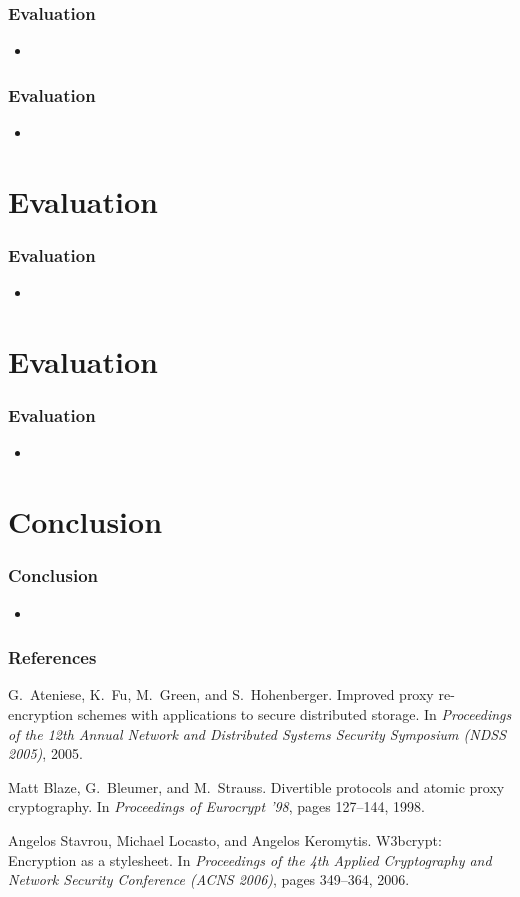 \documentclass{beamer}
\begin{document}
\begin{frame}
\frametitle{Evaluation}
\begin{itemize}
\item
\end{itemize}
\end{frame}

\begin{frame}
\frametitle{Evaluation}
\begin{itemize}
\item
\end{itemize}
\end{frame}

\section{Evaluation}
\begin{frame}
\frametitle{Evaluation}
\begin{itemize}
\item
\end{itemize}
\end{frame}

\section{Evaluation}
\begin{frame}
\frametitle{Evaluation}
\begin{itemize}
\item
\end{itemize}
\end{frame}

\section{Conclusion}
\begin{frame}
\frametitle{Conclusion}
\begin{itemize}
\item
\end{itemize}
\end{frame}

\begin{thebibliography}{10}
\frametitle{References}
G.~Ateniese, K.~Fu, M.~Green, and S.~Hohenberger.
\newblock Improved proxy re-encryption schemes with applications to secure
  distributed storage.
\newblock In {\em Proceedings of the 12th Annual Network and Distributed
  Systems Security Symposium (NDSS 2005)}, 2005.

Matt Blaze, G.~Bleumer, and M.~Strauss.
\newblock Divertible protocols and atomic proxy cryptography.
\newblock In {\em Proceedings of Eurocrypt '98}, pages 127--144, 1998.

Angelos Stavrou, Michael Locasto, and Angelos Keromytis.
\newblock W3bcrypt: Encryption as a stylesheet.
\newblock In {\em Proceedings of the 4th Applied Cryptography and Network
  Security Conference (ACNS 2006)}, pages 349--364, 2006.

\end{thebibliography}
\end{document}
